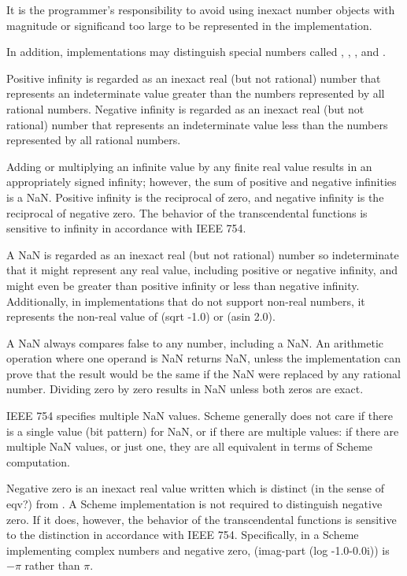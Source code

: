 It is the programmer's responsibility to avoid using inexact
number objects with magnitude or significand too large to be
represented in the implementation.

In addition, implementations may
distinguish special numbers called ,
, , and .

Positive infinity is regarded as an inexact real (but not rational)
number that represents an indeterminate value greater than the
numbers represented by all rational numbers. Negative infinity
is regarded as an inexact real (but not rational) number that
represents an indeterminate value less than the numbers represented
by all rational numbers.

Adding or multiplying an infinite value by any finite real value results
in an appropriately signed infinity; however, the sum of positive and
negative infinities is a NaN.  Positive infinity is the reciprocal
of zero, and negative infinity is the reciprocal of negative zero.
The behavior of the transcendental functions is sensitive to infinity
in accordance with IEEE 754.

A NaN is regarded as an inexact real (but not rational) number
so indeterminate that it might represent any real value, including
positive or negative infinity, and might even be greater than positive
infinity or less than negative infinity.
Additionally, in implementations that do not support non-real numbers, it
represents the non-real value of {\cf (sqrt -1.0)} or {\cf (asin 2.0)}.

A NaN always compares false to any number, including a NaN.  
An arithmetic operation where one operand is NaN returns NaN, unless the
implementation can prove that the result would be the same if the NaN
were replaced by any rational number.  Dividing zero by zero results in
NaN unless both zeros are exact.

IEEE 754 specifies multiple NaN values.  Scheme generally does
not care if there is a single value (bit pattern) for NaN,
or if there are multiple values: if there are multiple NaN
values, or just one, they are all equivalent in terms of Scheme
computation.

Negative zero is an inexact real value written {} which is distinct
(in the sense of {\cf eqv?}) from {}.  A Scheme implementation
is not required to distinguish negative zero.  If it does, however, the
behavior of the transcendental functions is sensitive to the distinction
in accordance with IEEE 754.
Specifically, in a Scheme implementing complex numbers and negative zero,
{\cf (imag-part (log -1.0-0.0i))} is $-\pi$ rather than $\pi$.

